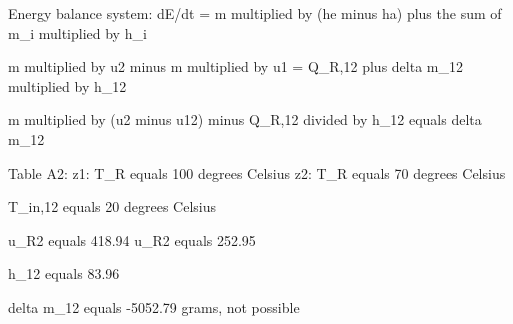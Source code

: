 Energy balance system:  
dE/dt = m multiplied by (he minus ha) plus the sum of m_i multiplied by h_i  

m multiplied by u2 minus m multiplied by u1 = Q_R,12 plus delta m_12 multiplied by h_12  

m multiplied by (u2 minus u12) minus Q_R,12 divided by h_12 equals delta m_12  

Table A2:  
z1: T_R equals 100 degrees Celsius  
z2: T_R equals 70 degrees Celsius  

T_in,12 equals 20 degrees Celsius  

u_R2 equals 418.94  
u_R2 equals 252.95  

h_12 equals 83.96  

delta m_12 equals -5052.79 grams, not possible